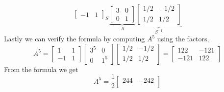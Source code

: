 \begin{enumerate}[label=\arabic*.]
\begin{mdframed}[style=MyFrame]
\begin{equation}
{\begin{bmatrix}
                        -1      &   1
                    \end{bmatrix}
                }_{S}
                \underbrace{
                    \begin{bmatrix}
                        3       &   0       \\
                        0       &   1
                    \end{bmatrix}
                }_{\Lambda}
                \underbrace{
                    \begin{bmatrix}
                        1/2     &   -1/2      \\
                        1/2     &   1/2
                    \end{bmatrix}
                }_{S^{-1}}
            \end{equation}
            Lastly we can verify the formula by computing $A^{5}$ using the
            factors,
            \begin{equation}
                A^{5} = 
                    \begin{bmatrix}
                        1       &   1       \\
                        -1      &   1
                    \end{bmatrix}
                    \begin{bmatrix}
                        3^{5}       &   0       \\
                        0           &   1^{5}
                    \end{bmatrix}
                    \begin{bmatrix}
                        1/2     &   -1/2      \\
                        1/2     &   1/2
                    \end{bmatrix}
                    =
                    \begin{bmatrix}
                        122         &       -121        \\
                        -121        &       122
                    \end{bmatrix}
            \end{equation}
            From the formula we get 
            \begin{equation}
                A^{5} = 
                \frac{1}{2}
                \begin{bmatrix}
                    244     &       -242        \\

\end{bmatrix}
\end{equation}
\end{mdframed}
\end{enumerate}
